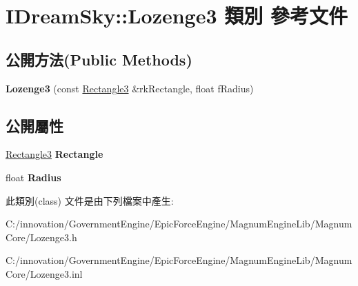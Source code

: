 \hypertarget{class_i_dream_sky_1_1_lozenge3}{}\section{I\+Dream\+Sky\+:\+:Lozenge3 類別 參考文件}
\label{class_i_dream_sky_1_1_lozenge3}
\subsection*{公開方法(Public Methods)}
\begin{DoxyCompactItemize}
\item 
{\bfseries Lozenge3} (const \hyperlink{class_i_dream_sky_1_1_rectangle3}{Rectangle3} \&rk\+Rectangle, float f\+Radius)\hypertarget{class_i_dream_sky_1_1_lozenge3_a11e4454f5a0e5dd988b268db955680a6}{}\label{class_i_dream_sky_1_1_lozenge3_a11e4454f5a0e5dd988b268db955680a6}

\end{DoxyCompactItemize}
\subsection*{公開屬性}
\begin{DoxyCompactItemize}
\item 
\hyperlink{class_i_dream_sky_1_1_rectangle3}{Rectangle3} {\bfseries Rectangle}\hypertarget{class_i_dream_sky_1_1_lozenge3_a81d3092c4936529852c9a2b9d222cb7c}{}\label{class_i_dream_sky_1_1_lozenge3_a81d3092c4936529852c9a2b9d222cb7c}

\item 
float {\bfseries Radius}\hypertarget{class_i_dream_sky_1_1_lozenge3_ae6a0334a0102c38cff2131bdc109a63c}{}\label{class_i_dream_sky_1_1_lozenge3_ae6a0334a0102c38cff2131bdc109a63c}

\end{DoxyCompactItemize}


此類別(class) 文件是由下列檔案中產生\+:\begin{DoxyCompactItemize}
\item 
C\+:/innovation/\+Government\+Engine/\+Epic\+Force\+Engine/\+Magnum\+Engine\+Lib/\+Magnum\+Core/Lozenge3.\+h\item 
C\+:/innovation/\+Government\+Engine/\+Epic\+Force\+Engine/\+Magnum\+Engine\+Lib/\+Magnum\+Core/Lozenge3.\+inl\end{DoxyCompactItemize}
